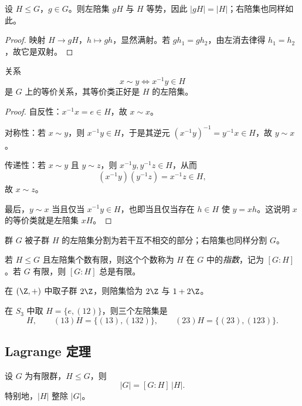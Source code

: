 \begin{proposition}
设 $H\le G$，$g\in G$。则左陪集 $gH$ 与 $H$ 等势，因此 $|gH|=|H|$；右陪集也同样如此。
\end{proposition}

\begin{proof}
映射 $H\to gH$，$h\mapsto gh$，显然满射。若 $gh_1=gh_2$，由左消去律得 $h_1=h_2$，故它是双射。
\end{proof}

\begin{proposition}
关系
\[
 x\sim y \iff x^{-1}y \in H
\]
是 $G$ 上的等价关系，其等价类正好是 $H$ 的左陪集。
\end{proposition}

\begin{proof}
自反性：$x^{-1}x=e\in H$，故 $x\sim x$。

对称性：若 $x\sim y$，则 $x^{-1}y\in H$，于是其逆元 $(x^{-1}y)^{-1}=y^{-1}x\in H$，故 $y\sim x$。

传递性：若 $x\sim y$ 且 $y\sim z$，则 $x^{-1}y,y^{-1}z\in H$，从而
\[
(x^{-1}y)(y^{-1}z)=x^{-1}z \in H,
\]
故 $x\sim z$。

最后，$y\sim x$ 当且仅当 $x^{-1}y\in H$，也即当且仅当存在 $h\in H$ 使 $y=xh$。这说明 $x$ 的等价类就是左陪集 $xH$。
\end{proof}

\begin{corollary}
群 $G$ 被子群 $H$ 的左陪集分割为若干互不相交的部分；右陪集也同样分割 $G$。
\end{corollary}

\begin{definition}
若 $H\le G$ 且左陪集个数有限，则这个个数称为 $H$ 在 $G$ 中的\emph{指数}，记为 $[G:H]$。若 $G$ 有限，则 $[G:H]$ 总是有限。
\end{definition}

\begin{example}
在 $(\Z,+)$ 中取子群 $2\Z$，则陪集恰为 $2\Z$ 与 $1+2\Z$。

在 $S_3$ 中取 $H=\{e,(12)\}$，则三个左陪集是
\[
H, \qquad (13)H=\{(13),(132)\}, \qquad (23)H=\{(23),(123)\}.
\]
\end{example}

\subsection*{Lagrange 定理}

\begin{theorem}[Lagrange 定理]
设 $G$ 为有限群，$H\le G$，则
\[
 |G|=[G:H]\,|H|.
\]
特别地，$|H|$ 整除 $|G|$。
\end{theorem}

